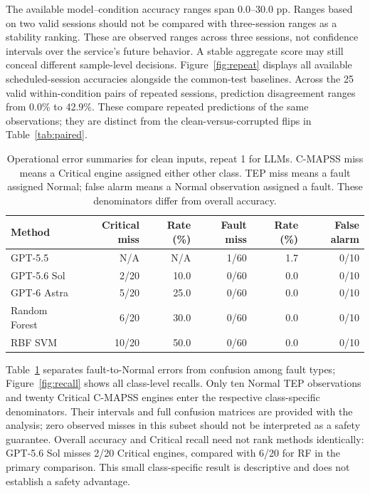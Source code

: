\documentclass[11pt,a4paper]{article}
\begin{document}
The available model--condition accuracy ranges span 0.0--30.0 pp. Ranges based on two valid sessions should not be compared with three-session ranges as a stability ranking. These are observed ranges across three sessions, not confidence intervals over the service's future behavior. A stable aggregate score may still conceal different sample-level decisions. Figure~\ref{fig:repeat} displays all available scheduled-session accuracies alongside the common-test baselines. Across the 25 valid within-condition pairs of repeated sessions, prediction disagreement ranges from 0.0\% to 42.9\%. These compare repeated predictions of the same observations; they are distinct from the clean-versus-corrupted flips in Table~\ref{tab:paired}.

\begin{table}[htbp]
\centering
\small
\caption{Operational error summaries for clean inputs, repeat 1 for LLMs. C-MAPSS miss means a Critical engine assigned either other class. TEP miss means a fault assigned Normal; false alarm means a Normal observation assigned a fault. These denominators differ from overall accuracy.}
\label{tab:errors}
\begin{tabular}{@{}lrrrrr@{}}
\toprule
Method & Critical miss & Rate (\%) & Fault miss & Rate (\%) & False alarm \\
\midrule
GPT-5.5 & N/A & N/A & 1/60 & 1.7 & 0/10 \\
GPT-5.6 Sol & 2/20 & 10.0 & 0/60 & 0.0 & 0/10 \\
GPT-6 Astra & 5/20 & 25.0 & 0/60 & 0.0 & 0/10 \\
Random Forest & 6/20 & 30.0 & 0/60 & 0.0 & 0/10 \\
RBF SVM & 10/20 & 50.0 & 0/60 & 0.0 & 0/10 \\
\bottomrule
\end{tabular}
\end{table}


Table~\ref{tab:errors} separates fault-to-Normal errors from confusion among fault types; Figure~\ref{fig:recall} shows all class-level recalls. Only ten Normal TEP observations and twenty Critical C-MAPSS engines enter the respective class-specific denominators. Their intervals and full confusion matrices are provided with the analysis; zero observed misses in this subset should not be interpreted as a safety guarantee. Overall accuracy and Critical recall need not rank methods identically: GPT-5.6 Sol misses 2/20 Critical engines, compared with 6/20 for RF in the primary comparison. This small class-specific result is descriptive and does not establish a safety advantage.
\end{document}

